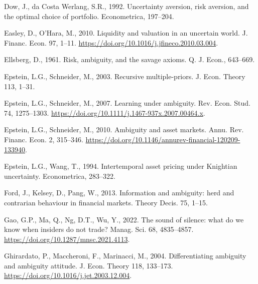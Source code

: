 \documentclass[12pt,a4paper]{article}
\newenvironment{biblock}{%
  \par\vspace{2pt}\noindent\small%
  \ignorespaces
}{%
  \par\vspace{2pt}%
}
\begin{document}
\begin{biblock}
Dow, J., da Costa Werlang, S.R., 1992. Uncertainty aversion, risk aversion, and the optimal choice of portfolio. Econometrica, 197--204.
\end{biblock}

\begin{biblock}
Easley, D., O'Hara, M., 2010. Liquidity and valuation in an uncertain world. J. Financ. Econ. 97, 1--11. \url{https://doi.org/10.1016/j.jfineco.2010.03.004}.
\end{biblock}

\begin{biblock}
Ellsberg, D., 1961. Risk, ambiguity, and the savage axioms. Q. J. Econ., 643--669.
\end{biblock}

\begin{biblock}
Epstein, L.G., Schneider, M., 2003. Recursive multiple-priors. J. Econ. Theory 113, 1--31.
\end{biblock}

\begin{biblock}
Epstein, L.G., Schneider, M., 2007. Learning under ambiguity. Rev. Econ. Stud. 74, 1275--1303. \url{https://doi.org/10.1111/j.1467-937x.2007.00464.x}.
\end{biblock}

\begin{biblock}
Epstein, L.G., Schneider, M., 2010. Ambiguity and asset markets. Annu. Rev. Financ. Econ. 2, 315--346. \url{https://doi.org/10.1146/annurev-financial-120209-133940}.
\end{biblock}

\begin{biblock}
Epstein, L.G., Wang, T., 1994. Intertemporal asset pricing under Knightian uncertainty. Econometrica, 283--322.
\end{biblock}

\begin{biblock}
Ford, J., Kelsey, D., Pang, W., 2013. Information and ambiguity: herd and contrarian behaviour in financial markets. Theory Decis. 75, 1--15.
\end{biblock}

\begin{biblock}
Gao, G.P., Ma, Q., Ng, D.T., Wu, Y., 2022. The sound of silence: what do we know when insiders do not trade? Manag. Sci. 68, 4835--4857. \url{https://doi.org/10.1287/mnsc.2021.4113}.
\end{biblock}

\begin{biblock}
Ghirardato, P., Maccheroni, F., Marinacci, M., 2004. Differentiating ambiguity and ambiguity attitude. J. Econ. Theory 118, 133--173. \url{https://doi.org/10.1016/j.jet.2003.12.004}.
\end{biblock}
\end{document}
